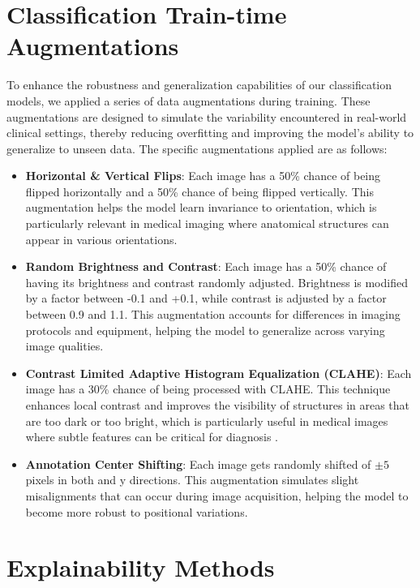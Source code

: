 \section{Classification Train-time Augmentations}
To enhance the robustness and generalization capabilities of our classification models, we applied a series of data augmentations during training. These augmentations are designed to simulate the variability encountered in real-world clinical settings, thereby reducing overfitting and improving the model's ability to generalize to unseen data. The specific augmentations applied are as follows:
\begin{itemize}
    \item \textbf{Horizontal \& Vertical Flips}: Each image has a 50\% chance of being flipped horizontally and a 50\% chance of being flipped vertically. This augmentation helps the model learn invariance to orientation, which is particularly relevant in medical imaging where anatomical structures can appear in various orientations.
    \item \textbf{Random Brightness and Contrast}: Each image has a 50\% chance of having its brightness and contrast randomly adjusted. Brightness is modified by a factor between -0.1 and +0.1, while contrast is adjusted by a factor between 0.9 and 1.1. This augmentation accounts for differences in imaging protocols and equipment, helping the model to generalize across varying image qualities.
    \item \textbf{Contrast Limited Adaptive Histogram Equalization (CLAHE)}: Each image has a 30\% chance of being processed with CLAHE. This technique enhances local contrast and improves the visibility of structures in areas that are too dark or too bright, which is particularly useful in medical images where subtle features can be critical for diagnosis \cite{mishra2021clahe}.
    \item \textbf{Annotation Center Shifting}: Each image gets randomly shifted of $\pm 5$ pixels in both and y directions. This augmentation simulates slight misalignments that can occur during image acquisition, helping the model to become more robust to positional variations.
\end{itemize}

\section{Explainability Methods}
\label{sec:xai_methods}

